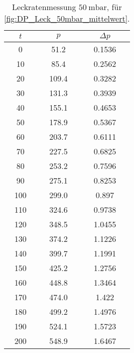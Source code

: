 \begin{table}[H]
    \centering
    \caption{Leckratenmessung $\SI{50}{\milli\bar}$, für  \autoref{fig:DP_Leck_50mbar_mittelwert}.}
    \label{tab:}
    \begin{tabular}{c c c}
        \toprule
        {$t$} & {$p$} & {$\Delta p$} \\
        \midrule
        0 & 51.2 & 0.1536  \\
        10 & 85.4 & 0.2562 \\
        20 & 109.4 & 0.3282\\
        30 & 131.3 & 0.3939\\
        40 & 155.1 & 0.4653\\
        50 & 178.9 & 0.5367\\
        60 & 203.7 & 0.6111\\
        70 & 227.5 & 0.6825\\
        80 & 253.2 & 0.7596\\
        90 & 275.1 & 0.8253\\
        100 & 299.0 & 0.897\\
        110 & 324.6 & 0.9738\\
        120 & 348.5 & 1.0455\\
        130 & 374.2 & 1.1226\\
        140 & 399.7 & 1.1991\\
        150 & 425.2 & 1.2756\\
        160 & 448.8 & 1.3464\\
        170 & 474.0 & 1.422\\
        180 & 499.2 & 1.4976\\
        190 & 524.1 & 1.5723\\
        200 & 548.9 & 1.6467\\
        \bottomrule
    \end{tabular}
\end{table}


